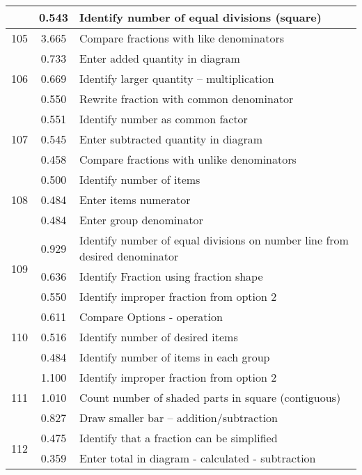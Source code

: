 \begin{longtable}[c]{|c|c|l|}
 & \small 0.543 & \small Identify number of equal divisions (square) \\
\hline
\multirow{1}{*}{\small 105} & \small 3.665 & \small Compare fractions with like denominators \\
\hline
\multirow{3}{*}{\small 106} & \small 0.733 & \small Enter added quantity in diagram \\
 & \small 0.669 & \small Identify larger quantity -- multiplication \\
 & \small 0.550 & \small Rewrite fraction with common denominator \\
\hline
\multirow{3}{*}{\small 107} & \small 0.551 & \small Identify number as common factor \\
 & \small 0.545 & \small Enter subtracted quantity in diagram \\
 & \small 0.458 & \small Compare fractions with unlike denominators \\
\hline
\multirow{3}{*}{\small 108} & \small 0.500 & \small Identify number of items \\
 & \small 0.484 & \small Enter items numerator \\
 & \small 0.484 & \small Enter group denominator \\
\hline
\multirow{3}{*}{\small 109} & \small 0.929 & \small Identify number of equal divisions on number line from desired denominator \\
 & \small 0.636 & \small Identify Fraction using fraction shape \\
 & \small 0.550 & \small Identify improper fraction from option 2 \\
\hline
\multirow{3}{*}{\small 110} & \small 0.611 & \small Compare Options - operation \\
 & \small 0.516 & \small Identify number of desired items \\
 & \small 0.484 & \small Identify number of items in each group \\
\hline
\multirow{3}{*}{\small 111} & \small 1.100 & \small Identify improper fraction from option 2 \\
 & \small 1.010 & \small Count number of shaded parts in square (contiguous) \\
 & \small 0.827 & \small Draw smaller bar -- addition/subtraction \\
\hline
\multirow{3}{*}{\small 112} & \small 0.475 & \small Identify that a fraction can be simplified \\
 & \small 0.359 & \small Enter total in diagram - calculated - subtraction \\

\end{longtable}
